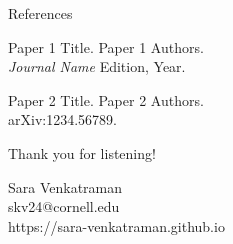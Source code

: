 \documentclass[dvipsnames, handout]{beamer}
\newcommand{\1}{\mathds{1}}	%
\begin{document}

\begin{frame}{References}
\begin{thebibliography}{10}
\beamertemplatearticlebibitems
{\small

Paper 1 Title.
\newblock Paper 1 Authors. \\
{\it Journal Name} Edition, Year.

Paper 2 Title.
\newblock Paper 2 Authors.\\
arXiv:1234.56789.
}
\end{thebibliography}
\end{frame}


\begin{frame}
\begin{center}
{\large\color{titleText} Thank you for listening!}
\vspace{1cm}

Sara Venkatraman \\[1em]
skv24@cornell.edu \\
https://sara-venkatraman.github.io
\end{center}
\end{frame}

\end{document}
